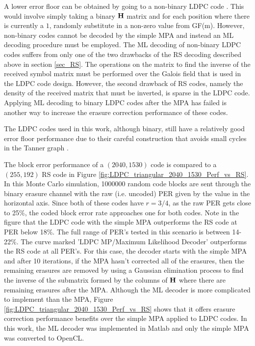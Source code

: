 \documentclass[conference]{IEEEtran}
\begin{document}
A lower error floor can be obtained by going to a non-binary LDPC code \cite{Garrammone_NonbinaryLDPC-10}.  This would involve simply taking a binary $\bf{H}$ matrix and for each position where there is currently a $1$, randomly substitute in a non-zero value from GF(m).  However, non-binary codes cannot be decoded by the simple MPA and instead an ML decoding procedure must be employed.  The ML decoding of non-binary LDPC codes suffers from only one of the two drawbacks of the RS decoding described above in section \ref{sec_RS}.  The operations  on the matrix to find the inverse of the received symbol matrix must be performed over the Galois field that is used in the LDPC code design.  However, the second drawback of RS codes, namely the density of the received matrix that must be inverted, is sparse in the LDPC code.  Applying ML decoding to binary LDPC codes after the MPA has failed is another way to increase the erasure correction performance of these codes.

The LDPC codes used in this work, although binary, still have a relatively good error floor performance due to their careful construction that avoids small cycles in the Tanner graph \cite{tanner-01}.  

The block error performance of a $(2040, 1530)$ code is compared to a $(255, 192)$ RS code in Figure \ref{fig:LDPC_triangular_2040_1530_Perf_vs_RS}.  In this Monte Carlo simulation, 1000000 random code blocks are sent through the binary erasure channel with the raw (i.e. uncoded) PER given by the value in the horizontal axis.  Since both of these codes have $r = 3/4$, as the raw PER gets close to 25\%, the coded block error rate approaches one for both codes.  Note in the figure that the LDPC code with the simple MPA outperforms the RS code at PER below 18\%.  The full range of PER's tested in this scenario is between 14-22\%.  The curve marked 'LDPC MP/Maximum Likelihood Decoder' outperforms the RS code at all PER's.  For this case, the decoder starts with the simple MPA and after 10 iterations, if the MPA hasn't corrected all of the erasures, then the remaining erasures are removed by using a Gaussian elimination process to find the inverse of the submatrix formed by the columns of $\bf{H}$ where there are remaining erasures after the MPA.  Although the ML decoder is more complicated to implement than the MPA, Figure \ref{fig:LDPC_triangular_2040_1530_Perf_vs_RS} shows that it offers erasure correction performance benefits over the simple MPA applied to LDPC codes.  In this work, the ML decoder was implemented in Matlab and only the simple MPA was converted to OpenCL.
\end{document}
